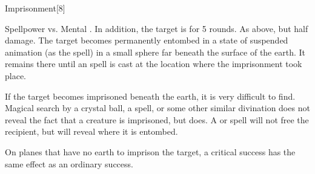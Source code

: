 \begin{spellsection}{Imprisonment}[8]
    \begin{spellheader}
    \end{spellheader}
    \begin{spellcontent}
        \begin{spelltargetinginfo}
        \end{spelltargetinginfo}
        \begin{spelleffects}
            \begin{spellattack}{Spellpower vs. Mental}
                \spellsuccess {}. In addition, the target is \slowed for 5 rounds.
                \spellfailure As above, but half damage.
                \spellcritical The target becomes permanently entombed in a state of suspended animation (as the  spell) in a small sphere far beneath the surface of the earth. It remains there until an  spell is cast at the location where the imprisonment took place.
            \end{spellattack}
        \end{spelleffects}
    \end{spellcontent}
    \begin{spellfooter}
        \spellnotes If the target becomes imprisoned beneath the earth, it is very difficult to find. Magical search by a crystal ball, a  spell, or some other similar divination does not reveal the fact that a creature is imprisoned, but  does. A  or  spell will not free the recipient, but will reveal where it is entombed.

        On planes that have no earth to imprison the target, a critical success has the same effect as an ordinary success.
        \miscastrandom
    \end{spellfooter}
\end{spellsection}

